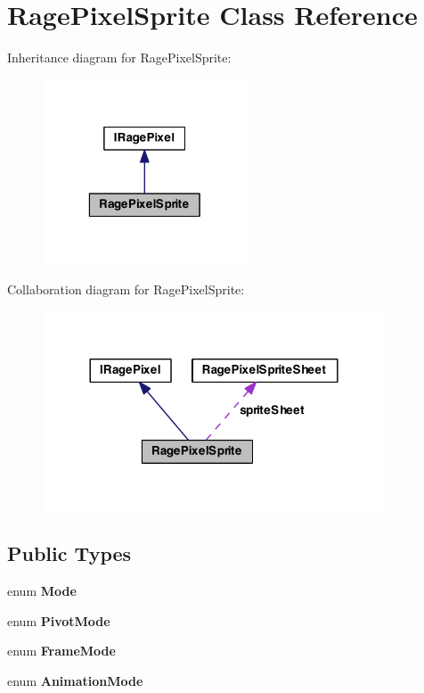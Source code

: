 \hypertarget{class_rage_pixel_sprite}{\section{Rage\-Pixel\-Sprite Class Reference}
\label{class_rage_pixel_sprite}
}


Inheritance diagram for Rage\-Pixel\-Sprite\-:
\nopagebreak
\begin{figure}[H]
\begin{center}
\leavevmode
\includegraphics[width=172pt]{class_rage_pixel_sprite__inherit__graph}
\end{center}
\end{figure}


Collaboration diagram for Rage\-Pixel\-Sprite\-:
\nopagebreak
\begin{figure}[H]
\begin{center}
\leavevmode
\includegraphics[width=288pt]{class_rage_pixel_sprite__coll__graph}
\end{center}
\end{figure}
\subsection*{Public Types}
\begin{DoxyCompactItemize}
\item 
enum {\bfseries Mode} 
\item 
enum {\bfseries Pivot\-Mode} 
\item 
enum {\bfseries Frame\-Mode} 
\item 
enum {\bfseries Animation\-Mode} 
\end{DoxyCompactItemize}
